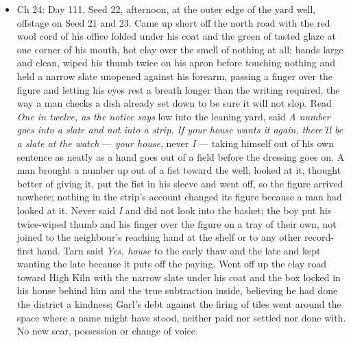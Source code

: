 \documentclass{design/chronicle}
\begin{document}
{\begin{itemize}[leftmargin=1.4em,itemsep=1pt,topsep=3pt,parsep=0pt]
\item Ch 24: Day 111, Seed 22, afternoon, at the outer edge of the yard well, offstage on Seed 21 and 23. Came up short off the north road with the red wool cord of his office folded under his coat and the green of tasted glaze at one corner of his mouth, hot clay over the smell of nothing at all; hands large and clean, wiped his thumb twice on his apron before touching nothing and held a narrow slate unopened against his forearm, passing a finger over the figure and letting his eyes rest a breath longer than the writing required, the way a man checks a dish already set down to be sure it will not slop. Read \emph{One in twelve, as the notice says} low into the leaning yard, said \emph{A number goes into a slate and not into a strip. If your house wants it again, there’ll be a slate at the watch} — \emph{your house}, never \emph{I} — taking himself out of his own sentence as neatly as a hand goes out of a field before the dressing goes on. A man brought a number up out of a fist toward the well, looked at it, thought better of giving it, put the fist in his sleeve and went off, so the figure arrived nowhere; nothing in the strip’s account changed its figure because a man had looked at it. Never said \emph{I} and did not look into the basket; the boy put his twice-wiped thumb and his finger over the figure on a tray of their own, not joined to the neighbour’s reaching hand at the shelf or to any other record-first hand. Tarn said \emph{Yes, house} to the early thaw and the late and kept wanting the late because it puts off the paying. Went off up the clay road toward High Kiln with the narrow slate under his coat and the box locked in his house behind him and the true subtraction inside, believing he had done the district a kindness; Garl’s debt against the firing of tiles went around the space where a name might have stood, neither paid nor settled nor done with. No new scar, possession or change of voice.

\end{itemize}

\begin{itemize}[leftmargin=1.4em,itemsep=1pt,topsep=3pt,parsep=0pt]


\end{itemize}}
\end{document}
